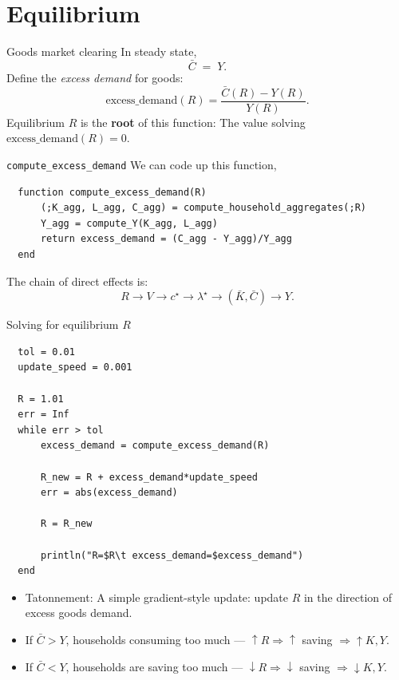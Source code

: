 \documentclass[10pt,aspectratio=169]{beamer}
\begin{document}
\section{Equilibrium}

\begin{frame}{Goods market clearing}
  In steady state,
  \[
    \bar C \;=\; Y.
  \]
  Define the \emph{excess demand} for goods:
  \[
    \text{excess\_demand}(R) = \frac{\bar C(R) - Y(R)}{Y(R)}.
  \]
  Equilibrium $R$ is the \textbf{root} of this function: The value solving $\text{excess\_demand}(R) = 0$.
\end{frame}

\begin{frame}[fragile]{\texttt{compute\_excess\_demand}}
  We can code up this function,
  \begin{lstlisting}
  function compute_excess_demand(R)
      (;K_agg, L_agg, C_agg) = compute_household_aggregates(;R)
      Y_agg = compute_Y(K_agg, L_agg)
      return excess_demand = (C_agg - Y_agg)/Y_agg
  end
  \end{lstlisting}
  The chain of direct effects is:
  \[
    R \to V \to c^\star \to \lambda^\star \to (\bar K, \bar C) \to Y.
  \]
\end{frame}

\begin{frame}[fragile]{Solving for equilibrium $R$}
  \begin{lstlisting}
  tol = 0.01
  update_speed = 0.001

  R = 1.01
  err = Inf
  while err > tol
      excess_demand = compute_excess_demand(R)

      R_new = R + excess_demand*update_speed
      err = abs(excess_demand)

      R = R_new

      println("R=$R\t excess_demand=$excess_demand")
  end
  \end{lstlisting}

  \begin{itemize}
    \item Tatonnement: A simple gradient-style update: update $R$ in the direction of excess goods demand.
    \item If $\bar C > Y$, households consuming too much --- $\uparrow R\Rightarrow \uparrow$ saving $\Rightarrow \uparrow K, Y$.
    \item If $\bar C < Y$, households are saving too much --- $\downarrow R\Rightarrow \downarrow$ saving $\Rightarrow \downarrow K, Y$.
  \end{itemize}
\end{frame}
\end{document}
